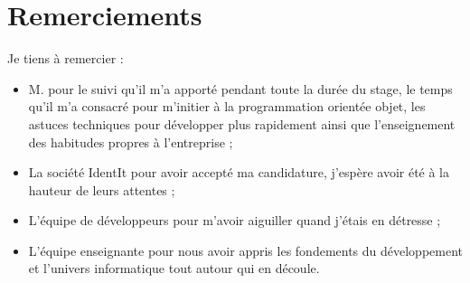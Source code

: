 \chapter*{Remerciements} %
\label{cha:Remerciements}

Je tiens à remercier :
\begin{itemize}
\item M. pour le suivi qu'il m'a apporté pendant toute la durée du
stage, le temps qu'il m'a consacré pour m'initier à la programmation orientée
objet, les astuces techniques pour développer plus rapidement ainsi que
l'enseignement des habitudes propres à l'entreprise ;
\item La société IdentIt pour avoir accepté ma candidature, j'espère avoir
été à la hauteur de leurs attentes ;
\item L'équipe de développeurs pour m'avoir aiguiller quand j'étais en
détresse ;
\item L'équipe enseignante pour nous avoir appris les fondements du
développement et l'univers informatique tout autour qui en découle.
\end{itemize}
